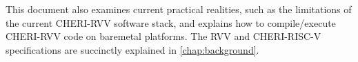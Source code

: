 \documentclass[../thesis]{subfiles}
\begin{document}
This document also examines current practical realities, such as the limitations of the current CHERI-RVV software stack, and explains how to compile/execute CHERI-RVV code on baremetal platforms.
The RVV and CHERI-RISC-V specifications are succinctly explained in \cref{chap:background}.


\vfill\null
\end{document}
